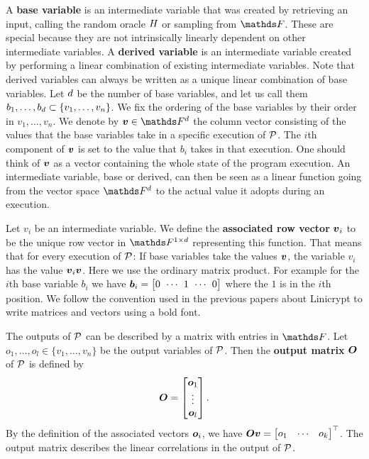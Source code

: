 A \textbf{base variable} is an intermediate variable that was created by retrieving an input,
calling the random oracle $\H$ or sampling from $\F$.
These are special because they are not intrinsically linearly dependent on other intermediate variables.
A \textbf{derived variable} is an intermediate variable created by performing a linear combination of existing intermediate variables.
Note that derived variables can always be written as a unique linear combination of base variables.
Let $\base$ be the number of base variables,
and let us call them $\dts b \base \subset \{\dts v n\}$.
We fix the ordering of the base variables by their order in $v_1, \dots, v_n$.
We denote by $\vbase \in \Base$ the column vector
consisting of the values that the base variables take in a specific execution of $\P$.
The $i$th component of $\vbase$ is set to the value that $b_i$ takes in that execution.
One should think of $\vbase$ as a vector containing the whole state of the program execution.
An intermediate variable, base or derived,
can then be seen as a linear function going from the vector space $\Fsp$ to the actual value it adopts during an execution.

Let $v_i$ be an intermediate variable.
We define the \textbf{associated row vector} $\v v_i$ to be the unique row vector in $\Frowsp$ representing this function.
That means that for every execution of $\P$:
If base variables take the values $\vbase$,
the variable $v_i$ has the value $\vv_i \vbase$.
Here we use the ordinary matrix product.
For example for the $i$th base variable $b_i$ we have 
$\v b_i = \m{0 & \cdots & 1 & \cdots & 0}$
where the $1$ is in the $i$th position.
We follow the convention used in the previous papers about Linicrypt to write matrices and vectors using a bold font.

The outputs of $\P$ can be described by a matrix with entries in $\F$.
Let $o_1, \dots, o_l \in \{v_1, \dots, v_n \}$ be the output variables of $\P$.
Then the \textbf{output matrix} $\O$ of $\P$ is defined by
\[
  \O =
  \begin{bmatrix}
  \v o_1\\
  \vdots \\
  \v o_l
  \end{bmatrix}.
\]
By the definition of the associated vectors $\v o_i$, we have
$
\O \vbase = 
  \begin{bmatrix} o_1 & \cdots & o_k \end{bmatrix}^\top
$.
The output matrix describes the linear correlations in the output of $\P$.

